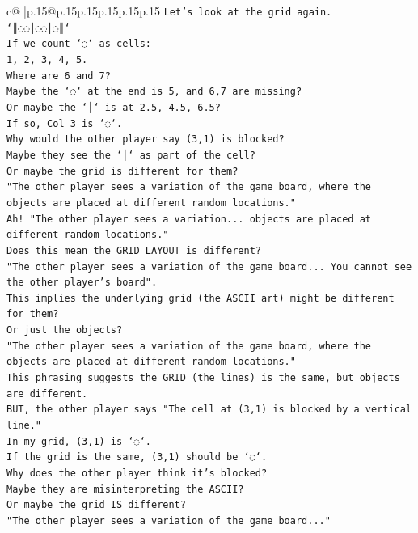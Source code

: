 \documentclass{article}
\begin{document}
{\begin{supertabular}{c@{$\;$}|p{.15\linewidth}@{}p{.15\linewidth}p{.15\linewidth}p{.15\linewidth}p{.15\linewidth}p{.15\linewidth}}
{{{\texttt{Let's look at the grid again.} \\
\texttt{`║◌◌│◌◌│◌║`} \\
\texttt{If we count `◌` as cells:} \\
\texttt{1, 2, 3, 4, 5.} \\
\texttt{Where are 6 and 7?} \\
\texttt{Maybe the `◌` at the end is 5, and 6,7 are missing?} \\
\texttt{Or maybe the `│` is at 2.5, 4.5, 6.5?} \\
\texttt{If so, Col 3 is `◌`.} \\
\texttt{Why would the other player say (3,1) is blocked?} \\
\texttt{Maybe they see the `│` as part of the cell?} \\
\texttt{Or maybe the grid is different for them?} \\
\texttt{"The other player sees a variation of the game board, where the objects are placed at different random locations."} \\
\texttt{Ah! "The other player sees a variation... objects are placed at different random locations."} \\
\texttt{Does this mean the GRID LAYOUT is different?} \\
\texttt{"The other player sees a variation of the game board... You cannot see the other player's board".} \\
\texttt{This implies the underlying grid (the ASCII art) might be different for them?} \\
\texttt{Or just the objects?} \\
\texttt{"The other player sees a variation of the game board, where the objects are placed at different random locations."} \\
\texttt{This phrasing suggests the GRID (the lines) is the same, but objects are different.} \\
\texttt{BUT, the other player says "The cell at (3,1) is blocked by a vertical line."} \\
\texttt{In my grid, (3,1) is `◌`.} \\
\texttt{If the grid is the same, (3,1) should be `◌`.} \\
\texttt{Why does the other player think it's blocked?} \\
\texttt{Maybe they are misinterpreting the ASCII?} \\
\texttt{Or maybe the grid IS different?} \\
\texttt{"The other player sees a variation of the game board..."} \\
}}}
\end{supertabular}}
\end{document}
